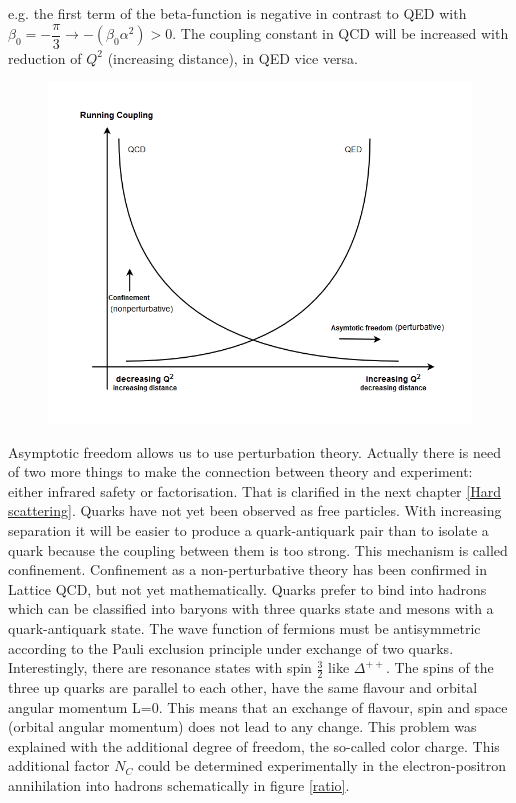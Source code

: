 e.g. the first term of the beta-function is negative in contrast to QED with $ \beta_0=- \dfrac{\pi}{3} \rightarrow -(\beta_0 \alpha^2) >0 $. The coupling constant in QCD will be increased
with reduction of $ Q^2 $ (increasing distance), in QED vice versa.
\begin{figure}[h!]
\centering
\includegraphics[scale=0.7]{images/Intro/QCDRunningCoupling.png}
\end{figure}



Asymptotic freedom allows us to use perturbation theory. Actually there is need of two more things to make the connection between theory and experiment: either infrared safety or factorisation. That is clarified in the next chapter \ref{Hard scattering}.
Quarks have not yet been observed as free particles. With increasing separation it will be easier to produce a quark-antiquark pair than to isolate a quark because the coupling between them is too strong. This mechanism is called confinement. Confinement as a non-perturbative theory has been confirmed in Lattice QCD, but not yet mathematically.
Quarks prefer to bind into hadrons which can be classified into baryons with three quarks state and mesons with a quark-antiquark state.
The wave function of fermions must be antisymmetric according to the Pauli exclusion principle under exchange of two quarks. Interestingly, there are resonance states with spin $ \frac{3}{2} $ like $ {\Delta}^{++} $.
The spins of the three up quarks are parallel to each other, have the same flavour and orbital angular momentum L=0. This means that an exchange of flavour, spin and space (orbital angular momentum) does not lead to any change. This problem was explained with the additional degree of freedom, the so-called color charge. This additional factor $N_C$ could be determined experimentally in the electron-positron annihilation into hadrons schematically in figure \ref{ratio}. 

